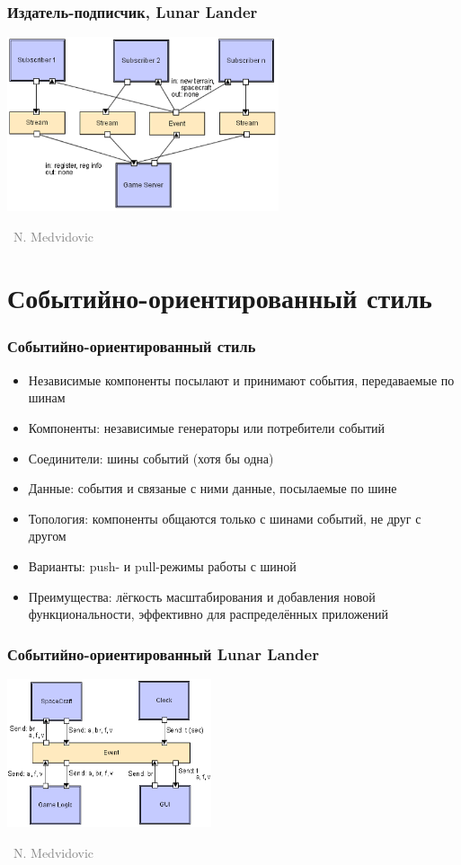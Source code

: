 \documentclass[xetex,mathserif,serif]{beamer}
\newcommand{\attribution}[1] {
	\vspace{-5mm}\begin{flushright}\begin{scriptsize}\textcolor{gray}{\textcopyright\, #1}\end{scriptsize}\end{flushright}
}
\begin{document}
	\begin{frame}
		\frametitle{Издатель-подписчик, Lunar Lander}
		\begin{center}
			\includegraphics[width=0.6\textwidth]{pubSubLL.png}
			\attribution{N. Medvidovic}
		\end{center}
	\end{frame}

	\section{Событийно-ориентированный стиль}

	\begin{frame}
		\frametitle{Событийно-ориентированный стиль}
		\begin{itemize}
			\item Независимые компоненты посылают и принимают события, передаваемые по шинам
			\item Компоненты: независимые генераторы или потребители событий
			\item Соединители: шины событий (хотя бы одна)
			\item Данные: события и связаные с ними данные, посылаемые по шине
			\item Топология: компоненты общаются только с шинами событий, не друг с другом
			\item Варианты: push- и pull-режимы работы с шиной
			\item Преимущества: лёгкость масштабирования и добавления новой функциональности, эффективно для распределённых приложений
		\end{itemize}
	\end{frame}

	\begin{frame}
		\frametitle{Событийно-ориентированный Lunar Lander}
		\begin{center}
			\includegraphics[width=0.45\textwidth]{eventBasedLL.png}
			\attribution{N. Medvidovic}
		\end{center}
	\end{frame}
\end{document}
